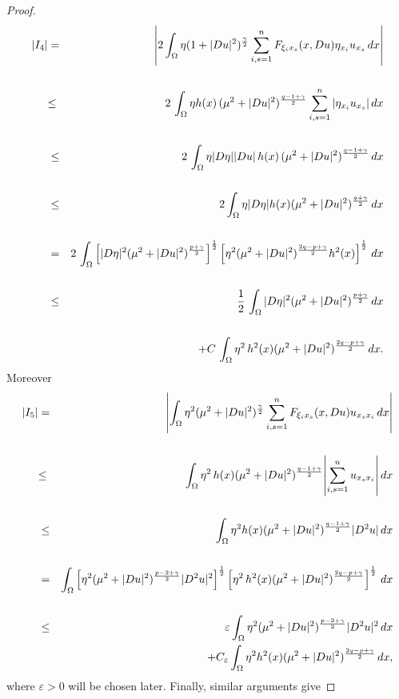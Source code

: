 \documentclass[12pt]{amsart}
\theoremstyle{definition}
\numberwithin{equation}{section}
\numberwithin{equation}{section}
\begin{document}
{\begin{proof}

\begin{eqnarray}\label{I4}
|{I}_4| &=& \left | 2 \int_{\Omega} \eta  (1 + |Du|^2)^{\frac{\gamma}{2}}  \sum_{i,s =1}^n F_{\xi_i x_s}(x, Du) \eta_{x_i} u_{x_s} \, dx \right |\cr\cr
&{\le}&  2\,  \int_{\Omega} \eta h(x) \, {({\mu}^2 + |Du|^2)^{\frac{q-1+\gamma}{2}}} \sum_{i,s=1}^n |\eta_{x_i} u_{x_s} | \, dx \cr\cr
&\le&   2\,  \int_{\Omega} \eta |D\eta| |Du| \, h(x) \, ({\mu^2} + |Du|^2)^{\frac{{q-1+\gamma}}{2}}  \, dx \cr\cr
&\le& 2\int_{\Omega} \eta|D\eta| h(x) {({\mu}^2 + |Du|^2)^{\frac{q+\gamma}{2}}}\,dx\cr\cr
&=&  2\, \int_{\Omega} \left[|D \eta|^2 ({\mu^2}+|Du|^2)^{\frac{p+\gamma}{2}} \right]^{\frac{1}{2}} \left[\eta^2 ({\mu^2}+|Du|^2)^{\frac{{2 q - p+\gamma}}{2}}h^2(x)\right]^{\frac{1}{2}} \, dx 
\cr\cr
&\le&  \frac{1}{2} \, \int_{\Omega} |D \eta|^2 ({\mu^2}+|Du|^2)^{\frac{p+\gamma}{2}} \, dx\cr \cr
&& +  C \, \int_{\Omega} \eta^2\, h^2(x)({\mu^2}+|Du|^2)^{\frac{{2 q - p+\gamma}}{2}} \, dx. 
\end{eqnarray}
Moreover
\begin{eqnarray}\label{I5}
|{I}_5| &=& \left| \int_{\Omega} \eta^2 ({\mu^2} + |Du|^2)^{\frac{\gamma}{2}} \sum_{i,s=1}^n F_{\xi_i x_s }(x, Du)  u_{x_s x_i} \, dx \right| \cr\cr
&{\le}&  \int_{\Omega} \eta^2\,h(x) ({\mu^2} + |Du|^2)^{\frac{{q-1+\gamma}}{2}}  {\left | \sum_{i,s=1}^n  u_{x_s x_i} \right |}\, dx \cr\cr
&\le&\,  \, \int_{\Omega} \eta^2 h(x) ({\mu^2} + |Du|^2)^{{\frac{q-1+\gamma}{2}}} |D^2 u| \, dx \cr\cr
&=& \int_{\Omega} \left[\eta^2 ({\mu^2}+|Du|^2)^{\frac{p-2+\gamma}{2}} |D^2 u|^2 \right]^{\frac{1}{2}} \left[\eta^2\,h^2(x) ({\mu^2}+|Du|^2)^{\frac{{2 q - p+\gamma}}{2}}\right]^{\frac{1}{2}} \, dx \cr\cr
&\le& \varepsilon \int_{\Omega} \eta^2 ({\mu^2} + |Du|^2)^{\frac{p-2+\gamma}{2}}  |D^2 u|^2 \, dx\\\nonumber&& + C_\varepsilon  \int_{\Omega} \eta^2 h^2(x)({\mu^2}+|Du|^2)^{\frac{{2 q - p+\gamma}}{2}} \, dx,
\end{eqnarray}
where $\varepsilon>0$ will be chosen later.
Finally, similar arguments give 


\end{proof}}
\end{document}
